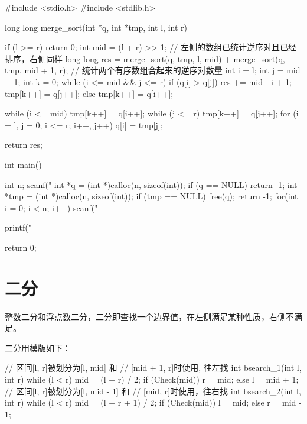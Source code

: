 \begin{mycpptwocol}[归并排序计算逆序对数量]
    #include <stdio.h>
    #include <stdlib.h>

    long long merge_sort(int *q, int *tmp,
    int l, int r) {
        if (l >= r) {
            return 0;
        }
        int mid = (l + r) >> 1;
        // 左侧的数组已统计逆序对且已经排序，右侧同样
        long long res = merge_sort(q, tmp, l, mid) + merge_sort(q, tmp, mid + 1, r);
        // 统计两个有序数组合起来的逆序对数量
        int i = l;
        int j = mid + 1;
        int k = 0;
        while (i <= mid && j <= r) {
            if (q[i] > q[j]) {
                res += mid - i + 1;
                tmp[k++] = q[j++];
            } else {
                tmp[k++] = q[i++];
            }
        }

        while (i <= mid) {
            tmp[k++] = q[i++];
        }
        while (j <= r) {
            tmp[k++] = q[j++];
        }
        for (i = l, j = 0; i <= r;
        i++, j++) {
            q[i] = tmp[j];
        }

        return res;
    }

    int main()
        {
        int n;
        scanf("%
        int *q = (int *)calloc(n, sizeof(int));
        if (q == NULL) {
            return -1;
        }
        int *tmp = (int *)calloc(n, sizeof(int));
        if (tmp == NULL) {
            free(q);
            return -1;
        }
        for(int i = 0; i < n; i++) {
            scanf("%
        }

        printf("%

        return 0;
    }
\end{mycpptwocol}


\section{二分}
整数二分和浮点数二分，二分即查找一个边界值，在左侧满足某种性质，右侧不满足。

二分用模版如下：
\begin{mycpptwocol}[二分模版]
    // 区间[l, r]被划分为[l, mid] 和
    // [mid + 1, r]时使用, 往左找
    int bsearch_1(int l, int r)
        {
        while (l < r) {
            mid = (l + r) / 2;
            if (Check(mid)) {
                r = mid;
            } else {
                l = mid + 1;
            }
        }
    }
    // 区间[l, r]被划分为[l, mid - 1] 和
    // [mid, r]时使用，往右找
    int bsearch_2(int l, int r)
        {
        while (l < r) {
            mid = (l + r + 1) / 2;
            if (Check(mid)) {
                l = mid;
            } else {
                r = mid - 1;
            }
        }
    }
\end{mycpptwocol}


